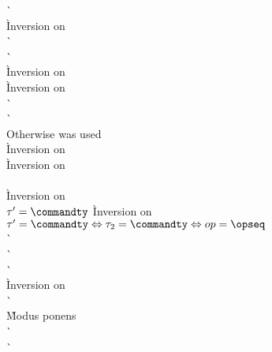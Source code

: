 \begin{description}
\begin{tabbing}
      \`  \\
      \` Inversion on  \\
      \`  \\
      \`  \\
      \` Inversion on  \\
      \` Inversion on  \\
      \`  \\
      \`  \- \\
  Otherwise  was used \+ \\
      \` Inversion on  \\
      \` Inversion on  \\
     \\
      \` Inversion on  \\
    $\tau' = \commandty$
      \` Inversion on  \\
    $\tau' = \commandty \Leftrightarrow \tau_2 = \commandty \Leftrightarrow op = \opseq$ \\
      \`  \\
      \`  \\
      \`  \\
      \` Inversion on  \\
      \`  \\
      \` Modus ponens \\
      \`  \\
      \`  \\
  \end{tabbing}



\end{description}
